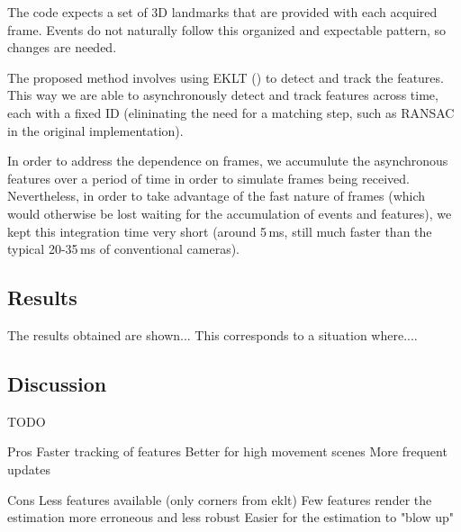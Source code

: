 \documentclass[10pt,twocolumn]{IEEEtran}
\begin{document}
The code expects a set of 3D landmarks that are provided with each acquired frame. Events do not naturally follow this organized and expectable pattern, so changes are needed.

The proposed method involves using EKLT (\cite{gehrig2020eklt}) to detect and track the features. This way we are able to asynchronously detect and track features across time, each with a fixed ID (elininating the need for a matching step, such as RANSAC in the original implementation). 

In order to address the dependence on frames, we accumulute the asynchronous features over a period of time in order to simulate frames being received. Nevertheless, in order to take advantage of the fast nature of frames (which would otherwise be lost waiting for the accumulation of events and features), we kept this integration time very short (around 5\,ms, still much faster than the typical 20-35\,ms of conventional cameras).

\subsection{Results}

The results obtained are shown... This corresponds to a situation where....

\subsection{Discussion}

TODO

Pros
Faster tracking of features
Better for high movement scenes
More frequent updates

Cons
Less features available (only corners from eklt)
Few features render the estimation more erroneous and less robust
Easier for the estimation to "blow up"




\end{document}
